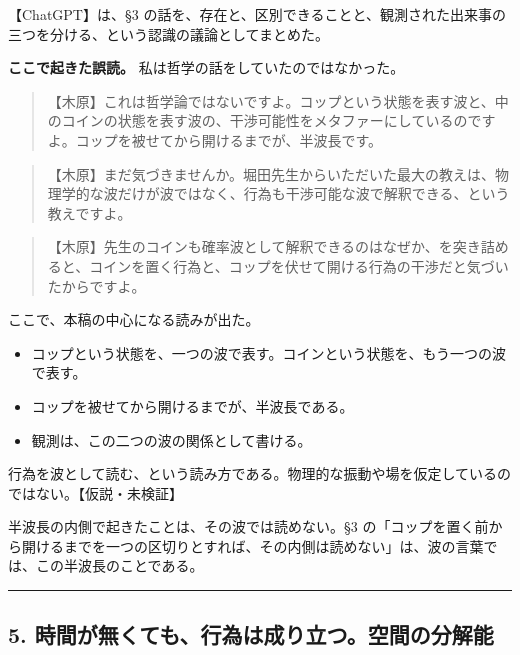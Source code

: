 \documentclass[
  a4paper,
]{ltjsarticle}
\providecommand{\tightlist}{%
  \setlength{\itemsep}{0pt}\setlength{\parskip}{0pt}}
\begin{document}
【ChatGPT】は、§3
の話を、存在と、区別できることと、観測された出来事の三つを分ける、という認識の議論としてまとめた。

\textbf{ここで起きた誤読。} 私は哲学の話をしていたのではなかった。

\begin{quote}
【木原】これは哲学論ではないですよ。コップという状態を表す波と、中のコインの状態を表す波の、干渉可能性をメタファーにしているのですよ。コップを被せてから開けるまでが、半波長です。
\end{quote}

\begin{quote}
【木原】まだ気づきませんか。堀田先生からいただいた最大の教えは、物理学的な波だけが波ではなく、行為も干渉可能な波で解釈できる、という教えですよ。
\end{quote}

\begin{quote}
【木原】先生のコインも確率波として解釈できるのはなぜか、を突き詰めると、コインを置く行為と、コップを伏せて開ける行為の干渉だと気づいたからですよ。
\end{quote}

ここで、本稿の中心になる読みが出た。

\begin{itemize}
\tightlist
\item
  コップという状態を、一つの波で表す。コインという状態を、もう一つの波で表す。
\item
  コップを被せてから開けるまでが、半波長である。
\item
  観測は、この二つの波の関係として書ける。
\end{itemize}

行為を波として読む、という読み方である。物理的な振動や場を仮定しているのではない。【仮説・未検証】

半波長の内側で起きたことは、その波では読めない。§3
の「コップを置く前から開けるまでを一つの区切りとすれば、その内側は読めない」は、波の言葉では、この半波長のことである。

\begin{center}\rule{0.5\linewidth}{0.5pt}\end{center}

\subsection{5.
時間が無くても、行為は成り立つ。空間の分解能}\label{ux6642ux9593ux304cux7121ux304fux3066ux3082ux884cux70baux306fux6210ux308aux7acbux3064ux7a7aux9593ux306eux5206ux89e3ux80fd}
\end{document}
